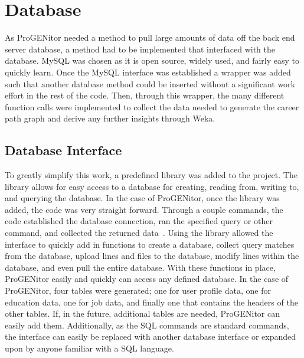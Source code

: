 \section{Database}
\label{sect:database}
As ProGENitor needed a method to pull large amounts of data off the back end
server database, a method had to be implemented that interfaced with
the database.  MySQL was chosen as it is open source, widely used, and fairly
easy to quickly learn.  Once the MySQL interface was established a wrapper was
added such that another database method could be inserted without a significant
work effort in the rest of the code.  Then, through this wrapper, the many
different function calls were implemented to collect the data needed to generate
the career path graph and derive any further insights through Weka.

\subsection{Database Interface}
To greatly simplify this work, a predefined library was added to the project.  The 
library allows for easy access to a database for creating, reading from,
writing to, and querying the database.  In the case of ProGENitor, once the
library was added, the code was very straight forward.  Through a couple
commands, the code established the database connection, ran the specified query
or other command, and collected the returned data~\cite{sqlite}.  Using the
library allowed the interface to quickly add in functions to create
a database, collect query matches from the database, upload lines and files to
the database, modify lines within the database, and even pull the entire
database.  With these functions in place, ProGENitor easily and quickly can
access any defined database.  In the case of ProGENitor, four tables were
generated; one for user profile data, one for education data, one for job data,
and finally one that contains the headers of the other tables.  If, in the
future, additional tables are needed, ProGENitor can easily add them. 
Additionally, as the SQL commands are standard commands, the interface can
easily be replaced with another database interface or expanded upon by anyone
familiar with a SQL language.


